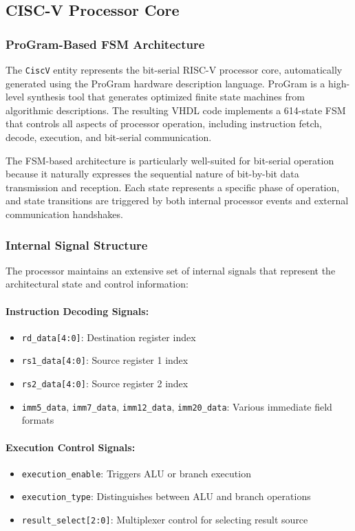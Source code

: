 \documentclass[12pt]{article}
\begin{document}
\subsection{CISC-V Processor Core}

\subsubsection{ProGram-Based FSM Architecture}

The \texttt{CiscV} entity represents the bit-serial RISC-V processor core, automatically generated using the ProGram hardware description language. ProGram is a high-level synthesis tool that generates optimized finite state machines from algorithmic descriptions. The resulting VHDL code implements a 614-state FSM that controls all aspects of processor operation, including instruction fetch, decode, execution, and bit-serial communication.

The FSM-based architecture is particularly well-suited for bit-serial operation because it naturally expresses the sequential nature of bit-by-bit data transmission and reception. Each state represents a specific phase of operation, and state transitions are triggered by both internal processor events and external communication handshakes.

\subsubsection{Internal Signal Structure}

The processor maintains an extensive set of internal signals that represent the architectural state and control information:

\paragraph{Instruction Decoding Signals:}
\begin{itemize}
    \item \texttt{rd\_data[4:0]}: Destination register index
    \item \texttt{rs1\_data[4:0]}: Source register 1 index
    \item \texttt{rs2\_data[4:0]}: Source register 2 index
    \item \texttt{imm5\_data}, \texttt{imm7\_data}, \texttt{imm12\_data}, \texttt{imm20\_data}: Various immediate field formats
\end{itemize}

\paragraph{Execution Control Signals:}
\begin{itemize}
    \item \texttt{execution\_enable}: Triggers ALU or branch execution
    \item \texttt{execution\_type}: Distinguishes between ALU and branch operations
    \item \texttt{result\_select[2:0]}: Multiplexer control for selecting result source
\end{itemize}
\end{document}
